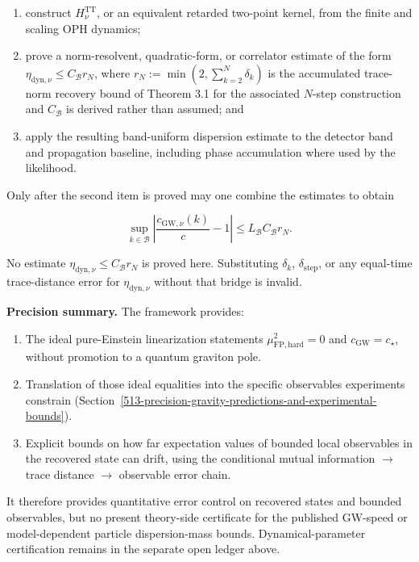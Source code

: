 \begin{enumerate}
\def\labelenumi{\arabic{enumi}.}
\tightlist
\item
  construct \(H_\nu^{\mathrm{TT}}\), or an equivalent retarded two-point kernel, from the finite and scaling OPH dynamics;
\item
  prove a norm-resolvent, quadratic-form, or correlator estimate of the form
  \(\eta_{\mathrm{dyn},\nu}\le C_{\mathcal B}r_N\), where \(r_N:=\min(2,\sum_{k=2}^N\delta_k)\) is the accumulated trace-norm recovery bound of Theorem 3.1 for the associated \(N\)-step construction and \(C_{\mathcal B}\) is derived rather than assumed; and
\item
  apply the resulting band-uniform dispersion estimate to the detector band and propagation baseline, including phase accumulation where used by the likelihood.
\end{enumerate}

Only after the second item is proved may one combine the estimates to obtain

\[
\sup_{k\in\mathcal B}
\left|\frac{c_{\mathrm{GW},\nu}(k)}{c}-1\right|
\le L_{\mathcal B}C_{\mathcal B}r_N.
\]

No estimate \(\eta_{\mathrm{dyn},\nu}\le C_{\mathcal B}r_N\) is proved here. Substituting \(\delta_k\), \(\delta_{\mathrm{step}}\), or any equal-time trace-distance error for \(\eta_{\mathrm{dyn},\nu}\) without that bridge is invalid.

\textbf{Precision summary.} The framework provides:

\begin{enumerate}
\def\labelenumi{\arabic{enumi}.}
\tightlist
\item
  The ideal pure-Einstein linearization statements \(\mu_{\mathrm{FP,hard}}^2=0\) and
  \(c_{\mathrm{GW}}=c_\star\), without promotion to a quantum graviton pole.
\item
  Translation of those ideal equalities into the specific observables experiments constrain (Section~\ref{513-precision-gravity-predictions-and-experimental-bounds}).
\item
  Explicit bounds on how far expectation values of bounded local observables in the recovered state can drift, using the conditional mutual information \ensuremath{\to} trace distance \ensuremath{\to} observable error chain.
\end{enumerate}

It therefore provides quantitative error control on recovered states and bounded observables, but no present theory-side certificate for the published GW-speed or model-dependent particle dispersion-mass bounds. Dynamical-parameter certification remains in the separate open ledger above.

